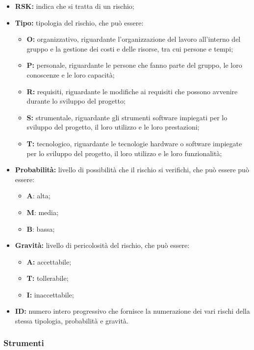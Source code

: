 			\begin{itemize}
				\item \textbf{RSK:} indica che si tratta di un rischio;
				\item \textbf{Tipo:} tipologia del rischio, che può essere:
				\begin{itemize}
					\item \textbf{O:} organizzativo, riguardante l'organizzazione del lavoro all'interno del gruppo e la gestione dei costi e delle risorse, tra cui persone e tempi;
					\item \textbf{P:} personale, riguardante le persone che fanno parte del gruppo, le loro conoscenze e le loro capacità; 
					\item \textbf{R:} requisiti, riguardante le modifiche ai requisiti che possono avvenire durante lo sviluppo del progetto;
					\item \textbf{S:} strumentale, riguardante gli strumenti software impiegati per lo sviluppo del progetto, il loro utilizzo e le loro prestazioni;
					\item \textbf{T:} tecnologico, riguardante le tecnologie hardware o software impiegate per lo sviluppo del progetto, il loro utilizzo e le loro funzionalità;	
				\end{itemize}
				\item \textbf{Probabilità:} livello di possibilità che il rischio si verifichi, che può essere può essere:
				\begin{itemize}
					\item \textbf{A}: alta;
					\item \textbf{M}: media;
					\item \textbf{B}: bassa;
				\end{itemize}
				\item \textbf{Gravità:} livello di pericolosità del rischio, che può essere:
				\begin{itemize}
					\item \textbf{A:} accettabile;
					\item \textbf{T:} tollerabile;
					\item \textbf{I:} inaccettabile;		
				\end{itemize}
				\item \textbf{ID:} numero intero progressivo che fornisce la numerazione dei vari rischi della stessa tipologia, probabilità e gravità. 
				
			\end{itemize}
	
	\subsubsection{Strumenti}
	
